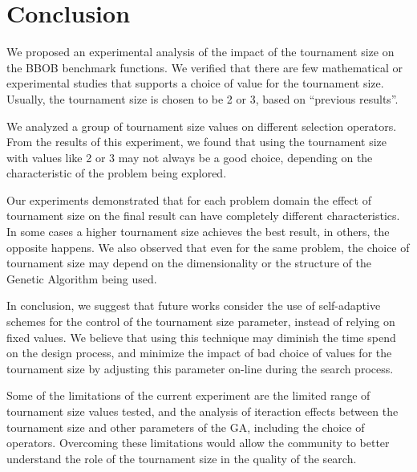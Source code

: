 \section{Conclusion}
\label{sec:conclusion}


We proposed an experimental analysis of the impact of the tournament
size on the BBOB benchmark functions. We verified that there are few
mathematical or experimental studies that supports a choice of value
for the tournament size. Usually, the tournament size is chosen to be
2 or 3, based on ``previous results''.
 
We analyzed a group of tournament size values on different selection
operators. From the results of this experiment, we found that using
the tournament size with values like 2 or 3 may not always be a good
choice, depending on the characteristic of the problem being explored.

Our experiments demonstrated that for each problem domain the effect
of tournament size on the final result can have completely different
characteristics. In some cases a higher tournament size achieves the
best result, in others, the opposite happens. We also observed
that even for the same problem, the choice of tournament size may
depend on the dimensionality or the structure of the Genetic Algorithm
being used.

In conclusion, we suggest that future works consider the use of
self-adaptive schemes for the control of the tournament size
parameter, instead of relying on fixed values. We believe that using
this technique may diminish the time spend on the design process, and
minimize the impact of bad choice of values for the tournament size by
adjusting this parameter on-line during the search process.

Some of the limitations of the current experiment are the limited
range of tournament size values tested, and the analysis of iteraction
effects between the tournament size and other parameters of the GA,
including the choice of operators.  Overcoming these limitations would
allow the community to better understand the role of the tournament
size in the quality of the search.



